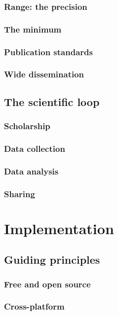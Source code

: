 \documentclass[11pt]{book}
\begin{document}
\section{Range: the precision}
\label{sec-1-2-2}
\section{The minimum}
\label{sec-1-2-3}
\section{Publication standards}
\label{sec-1-2-4}
\section{Wide dissemination}
\label{sec-1-2-5}
\chapter{The scientific loop}
\label{sec-1-3}
\section{Scholarship}
\label{sec-1-3-1}
\section{Data collection}
\label{sec-1-3-2}
\section{Data analysis}
\label{sec-1-3-3}
\section{Sharing}
\label{sec-1-3-4}
\part{Implementation}
\label{sec-2}
\chapter{Guiding principles}
\label{sec-2-1}
\section{Free and open source}
\label{sec-2-1-1}
\section{Cross-platform}
\label{sec-2-1-2}
\end{document}

